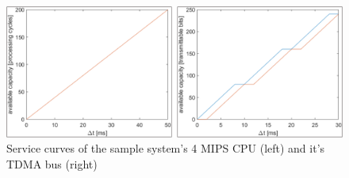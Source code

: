 \begin{figure}
    \centering
    \includegraphics[width=\columnwidth]{graphics/example_b_ins.png}
    \caption{Service curves of the sample system's 4 MIPS CPU (left) and it's TDMA bus (right)}\label{fig:b-ins}
\end{figure}